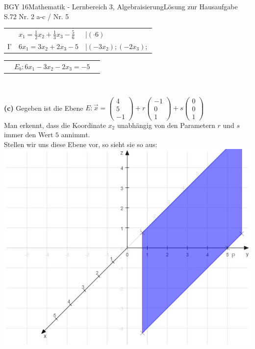 \documentclass[oneside,openany,headings=optiontotoc,11pt,numbers=noenddot]{scrreprt}
\begin{document}
\begin{worksheet}{BGY 16}{Mathematik - Lernbereich 3, Algebraisierung}{Lösung zur Hausaufgabe S.72 Nr. 2 a-c / Nr. 5}
\begin{framed}
\begin{tabularx}{\textwidth}{lll}
				& \(x_1 = \frac{1}{2}x_2 + \frac{1}{3}x_3 - \frac{5}{6}\) & |\((\cdot 6)\)\\
				I' & \(6x_1 = 3x_2 + 2x_3 - 5\) & |\((-3x_2);(-2x_3);\)\\
			\end{tabularx}
			\begin{tabularx}{\textwidth}{lll}
				& \colorbox{green!10}{\(E_b: 6x_1 - 3x_2 - 2x_3 = -5\)}
			\end{tabularx}\\
			\par
			\textbf{(c)} Gegeben ist die Ebene \(E:\vec{x} = \left(\begin{array}{c}4\\5\\-1\end{array}\right) + r\left(\begin{array}{c}-1\\0\\1\end{array}\right) + s\left(\begin{array}{c}0\\0\\1\end{array}\right)\)\\
			Man erkennt, dass die Koordinate \(x_2\) unabhängig von den Parametern \(r\) und \(s\) immer den Wert \(5\) annimmt.\\
			Stellen wir uns diese Ebene vor, so sieht sie so aus:\\
			\includegraphics[scale=0.45]{Bilder/S72N2c.jpg}\\

\end{framed}
\end{worksheet}
\end{document}
